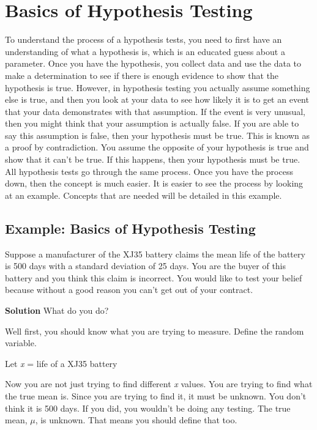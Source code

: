 \documentclass[
]{book}
\begin{document}
\hypertarget{basics-of-hypothesis-testing}{%
\section{Basics of Hypothesis Testing}\label{basics-of-hypothesis-testing}}

To understand the process of a hypothesis tests, you need to first have an understanding of what a hypothesis is, which is an educated guess about a parameter. Once you have the hypothesis, you collect data and use the data to make a determination to see if there is enough evidence to show that the hypothesis is true. However, in hypothesis testing you actually assume something else is true, and then you look at your data to see how likely it is to get an event that your data demonstrates with that assumption. If the event is very unusual, then you might think that your assumption is actually false. If you are able to say this assumption is false, then your hypothesis must be true. This is known as a proof by contradiction. You assume the opposite of your hypothesis is true and show that it can't be true. If this happens, then your hypothesis must be true. All hypothesis tests go through the same process. Once you have the process down, then the concept is much easier. It is easier to see the process by looking at an example. Concepts that are needed will be detailed in this example.

\hypertarget{example-basics-of-hypothesis-testing}{%
\subsection{Example: Basics of Hypothesis Testing}\label{example-basics-of-hypothesis-testing}}

Suppose a manufacturer of the XJ35 battery claims the mean life of the battery is 500 days with a standard deviation of 25 days. You are the buyer of this battery and you think this claim is incorrect. You would like to test your belief because without a good reason you can't get out of your contract.

\textbf{Solution}
What do you do?

Well first, you should know what you are trying to measure. Define the random variable.

Let \emph{x} = life of a XJ35 battery

Now you are not just trying to find different \emph{x} values. You are trying to find what the true mean is. Since you are trying to find it, it must be unknown. You don't think it is 500 days. If you did, you wouldn't be doing any testing. The true mean, \(\mu\), is unknown. That means you should define that too.
\end{document}
